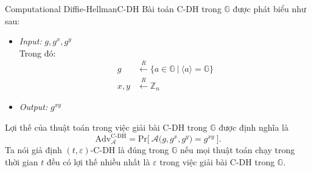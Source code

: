 \documentclass[class=report, crop=false]{standalone}
\begin{document}
		\begin{problem}{Computational Diffie-Hellman}{C-DH}
			Bài toán C-DH trong $\mathbb{G}$ được phát biểu như sau:
			\vspace{-\baselineskip}
			\begin{itemize}[leftmargin=1.5cm, itemindent=-0.5cm]
				\item[] \textit{Input:} $g, g^x, g^y$ \\
				Trong đó: \vspace{-\baselineskip}
				\begin{align*}
					g 		&\xleftarrow{R} \{ a \in \mathbb{G}\ | \ \langle a \rangle = \mathbb{G} \} \\
					x, y 	&\xleftarrow{R} \mathbb{Z}_n
				\end{align*}
				\item[] \textit{Output:} $g^{xy}$
			\end{itemize}
			\vspace{-\baselineskip}\par
			Lợi thế của thuật toán \algo trong việc giải bài C-DH trong $\mathbb{G}$ được định nghĩa là
			\[
				\text{Adv}_{\mathcal{A}}^{\text{C-DH}} = \text{Pr}\bigg[ \ \mathcal{A}\Big(g, g^x, g^y \Big) = g^{xy} \ \bigg].
			\] \indent
			Ta nói giả định $(t, \varepsilon)$-C-DH là đúng trong $\mathbb{G}$ nếu mọi thuật toán chạy trong thời gian $t$ đều có lợi thế nhiều nhất là $\varepsilon$ trong việc giải bài C-DH trong $\mathbb{G}$.
		\end{problem}
\end{document}
